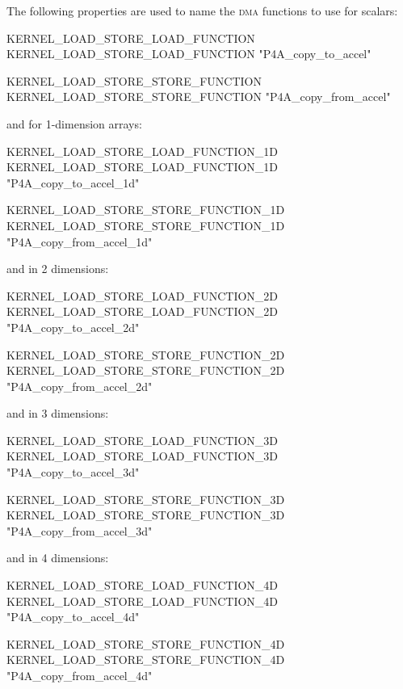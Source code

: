 \documentclass[a4paper]{report}
\begin{document}
The following properties are used to name the \textsc{dma} functions to
use for scalars:
\begin{PipsProp}{KERNEL_LOAD_STORE_LOAD_FUNCTION}
KERNEL_LOAD_STORE_LOAD_FUNCTION "P4A_copy_to_accel"
\end{PipsProp}

\begin{PipsProp}{KERNEL_LOAD_STORE_STORE_FUNCTION}
KERNEL_LOAD_STORE_STORE_FUNCTION "P4A_copy_from_accel"
\end{PipsProp}

and for 1-dimension arrays:
\begin{PipsProp}{KERNEL_LOAD_STORE_LOAD_FUNCTION_1D}
KERNEL_LOAD_STORE_LOAD_FUNCTION_1D "P4A_copy_to_accel_1d"
\end{PipsProp}

\begin{PipsProp}{KERNEL_LOAD_STORE_STORE_FUNCTION_1D}
KERNEL_LOAD_STORE_STORE_FUNCTION_1D "P4A_copy_from_accel_1d"
\end{PipsProp}

and in 2 dimensions:
\begin{PipsProp}{KERNEL_LOAD_STORE_LOAD_FUNCTION_2D}
KERNEL_LOAD_STORE_LOAD_FUNCTION_2D "P4A_copy_to_accel_2d"
\end{PipsProp}

\begin{PipsProp}{KERNEL_LOAD_STORE_STORE_FUNCTION_2D}
KERNEL_LOAD_STORE_STORE_FUNCTION_2D "P4A_copy_from_accel_2d"
\end{PipsProp}

and in 3 dimensions:
\begin{PipsProp}{KERNEL_LOAD_STORE_LOAD_FUNCTION_3D}
KERNEL_LOAD_STORE_LOAD_FUNCTION_3D "P4A_copy_to_accel_3d"
\end{PipsProp}

\begin{PipsProp}{KERNEL_LOAD_STORE_STORE_FUNCTION_3D}
KERNEL_LOAD_STORE_STORE_FUNCTION_3D "P4A_copy_from_accel_3d"
\end{PipsProp}

and in 4 dimensions:
\begin{PipsProp}{KERNEL_LOAD_STORE_LOAD_FUNCTION_4D}
KERNEL_LOAD_STORE_LOAD_FUNCTION_4D "P4A_copy_to_accel_4d"
\end{PipsProp}

\begin{PipsProp}{KERNEL_LOAD_STORE_STORE_FUNCTION_4D}
KERNEL_LOAD_STORE_STORE_FUNCTION_4D "P4A_copy_from_accel_4d"
\end{PipsProp}
\end{document}

